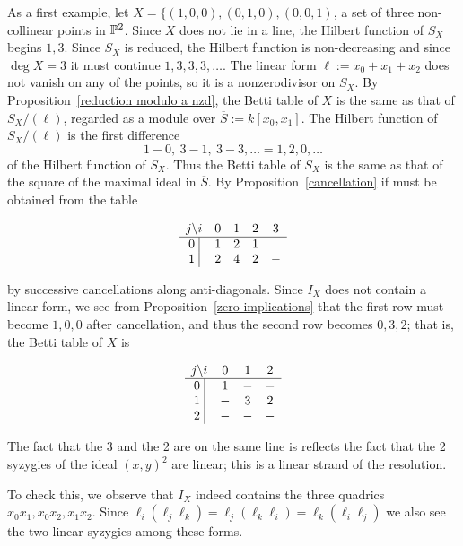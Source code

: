 \begin{example}\label{3 points in P2}
As a first example, let $X = \{(1,0,0), (0,1,0), (0,0,1)$, a set of three non-collinear points in ${\mathbb P}^2$. Since $X$ does not lie in a line, the Hilbert function of $S_{X}$ begins $1,3$. Since $S_{X}$ is reduced, the Hilbert function is non-decreasing and since $\deg X = 3$ it must continue $1,3,3,3,\dots$. The linear form 
$\ell :=x_{0}+x_{1}+x_{2}$ does not vanish on any of the points, so it is a nonzerodivisor on $S_{X}$. By Proposition~\ref{reduction modulo a nzd}, the Betti table of $X$ is the same as that of 
$S_{X}/(\ell)$, regarded as a module over $\overline S := k[x_{0}, x_{1}]$. The Hilbert function of $S_{X}/(\ell)$ is the first difference 
$$
1-0,\ 3-1,\ 3-3,\dots = 1,2,0,\dots
$$
of the Hilbert function of $S_{X}$. Thus the Betti table of $S_{X}$ is the same as that of the square of the maximal ideal in $\overline S$. By Proposition~\ref{cancellation} if must be obtained from the table
\begin{small}
$$
\begin{matrix}
j \backslash i &0&1&2&3\\ \hline
\text{0 }\vline &1&2&1\\
\text{1 }\vline &2&4&2&-\\
\end{matrix}
$$
\end{small}
by successive cancellations along anti-diagonals. Since $I_{X}$ does not contain a linear form, we see from Proposition~\ref{zero implications} that the first row
must become $1,0,0$ after cancellation, and thus the second row becomes
$0,3,2$; that is, the Betti table of $X$ is
\begin{small}
$$
\begin{matrix}
j \backslash i     &0&1&2\\ \hline
\text{0 }\vline &1&-&-\\
\text{1 }\vline &-&3&2\\
\text{2 }\vline &-&-&-\\
\end{matrix}
$$
\end{small}
The fact that the 3 and the 2 are on the same line is reflects the fact that the 2 syzygies of the ideal $(x,y)^{2}$ are linear; this is a linear strand of the resolution. 

To check this, we observe that $I_{X}$ indeed contains the three quadrics $x_{0}x_{1}, x_{0}x_{2}, x_{1}x_{2}$.
Since $ \ell_i(\ell_j\ell_k) = \ell_j(\ell_k\ell_i) = \ell_k(\ell_i\ell_j)$ we also see the
 two linear syzygies among these forms. 
 

\end{example}
